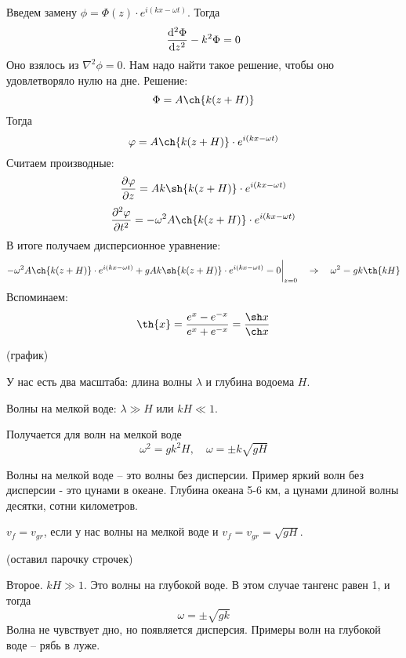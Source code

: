Введем замену $\phi=\Phi(z)\cdot e^{i(kx- \omega t)}$. Тогда
\begin{equation}
	\dv[2]{\Phi}{z}-k^2\Phi=0
\end{equation}
Оно взялось из $\nabla^2\phi=0$. Нам надо найти такое решение, чтобы оно удовлетворяло нулю на дне. 
Решение:
\begin{equation}
	\Phi=A\ch{k(z+H)}
\end{equation}
Тогда
\begin{equation}
	\phi=A\ch{k(z+H)}\cdot e^{i(kx- \omega t)}
\end{equation}
Считаем производные:
\begin{equation}
	\pdv{\phi}{z}=Ak\sh{k(z+H)}\cdot e^{i(kx- \omega t)}
\end{equation}
\begin{equation}
	\pdv[2]{\phi}{t}=-\omega^2A\ch{k(z+H)}\cdot e^{i(kx- \omega t)}
\end{equation}
В итоге получаем дисперсионное уравнение:
\begin{equation}
	-\omega^2A\ch{k(z+H)}\cdot e^{i(kx- \omega t)}+gAk\sh{k(z+H)}\cdot e^{i(kx- \omega t)}=0 \bigg|_{z=0}
	\quad \Rightarrow \quad
	\omega^2=gk\th{kH}
\end{equation}
Вспоминаем:
\begin{equation}
	\th{x}=\frac{e^x-e^{-x}}{e^{x}+e^{-x}}=\frac{\sh x}{\ch x}
\end{equation}

(график)

У нас есть два масштаба: длина волны $\lambda$ и глубина водоема $H$.

Волны на мелкой воде: $\lambda \gg H$ или $kH\ll 1$.

Получается для волн на мелкой воде
\begin{equation}
	\omega^2=gk^2H, \quad \omega=\pm k\sqrt{gH}
\end{equation}

Волны на мелкой воде -- это волны без дисперсии. Пример яркий волн без дисперсии - это цунами в океане. Глубина океана 5-6 км, а цунами длиной волны десятки, сотни километров.

$v_f=v_{gr}$, если у нас волны на мелкой воде и $v_f=v_{gr}=\sqrt{gH}$.

(оставил парочку строчек)

Второе. $kH \gg 1$. Это волны на глубокой воде. В этом случае тангенс равен 1, и тогда
\begin{equation}
	\omega=\pm\sqrt{gk}
\end{equation}
Волна не чувствует дно, но появляется дисперсия. Примеры волн на глубокой воде -- рябь в луже.

